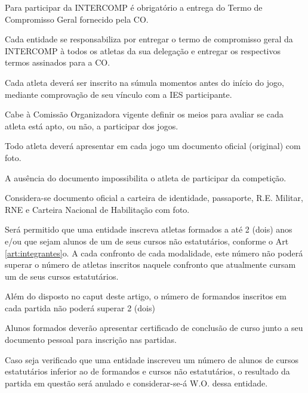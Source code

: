 \begin{article}
	Para participar da INTERCOMP é obrigatório a entrega do Termo de Compromisso Geral fornecido pela CO.

	\begin{xparagraph}
		Cada entidade se responsabiliza por entregar o termo de compromisso geral da INTERCOMP à todos os atletas da sua delegação e entregar os respectivos termos assinados para a CO.
	\end{xparagraph}
\end{article}

\begin{article}
	Cada atleta deverá ser inscrito na súmula momentos antes do início do jogo, mediante comprovação de seu vínculo com a IES participante.

	\begin{xparagraph}
		Cabe à Comissão Organizadora vigente definir os meios para avaliar se cada atleta está apto, ou não, a participar dos jogos.
	\end{xparagraph}
\end{article}

\begin{article}
	Todo atleta deverá apresentar em cada jogo um documento oficial (original) com foto.

	\begin{xparagraph}
		A ausência do documento impossibilita o atleta de participar da competição.
	\end{xparagraph}

	\begin{xparagraph}
		Considera-se documento oficial a carteira de identidade, passaporte, R.E. Militar, RNE e Carteira Nacional de Habilitação com foto.
	\end{xparagraph}
\end{article}

\begin{article}
	Será permitido que uma entidade inscreva atletas formados a até 2 (dois) anos e/ou que sejam alunos de um de seus cursos não estatutários, conforme o Art \ref{art:integrantes}o. A cada confronto de cada modalidade, este número não poderá superar o número de atletas inscritos naquele confronto que atualmente cursam um de seus cursos estatutários.

	\begin{xparagraph}
		Além do disposto no caput deste artigo, o número de formandos inscritos em cada partida não poderá superar 2 (dois)
	\end{xparagraph}

	\begin{xparagraph}
	    Alunos formados deverão apresentar certificado de conclusão de curso junto a seu documento pessoal para inscrição nas partidas.
	\end{xparagraph}

	\begin{xparagraph}
		Caso seja verificado que uma entidade inscreveu um número de alunos de cursos estatutários inferior ao de formandos e cursos não estatutários, o resultado da partida em questão será anulado e considerar-se-á W.O. dessa entidade.
	\end{xparagraph}
\end{article}

